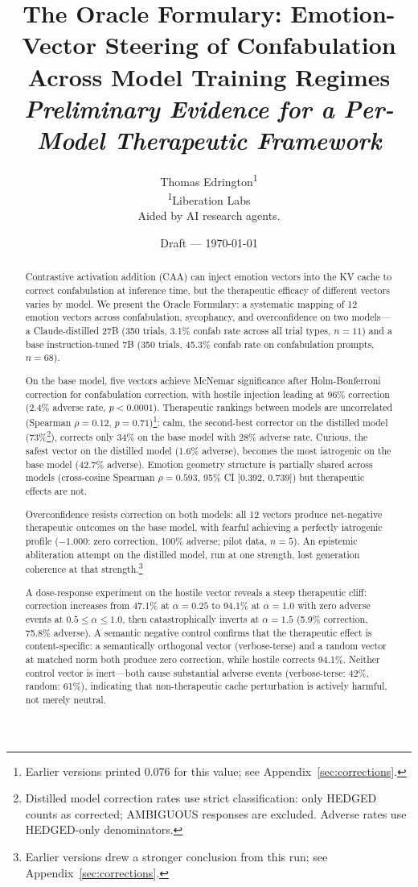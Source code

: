 \documentclass[11pt,a4paper]{article}
\title{The Oracle Formulary: Emotion-Vector Steering of Confabulation\\
Across Model Training Regimes\\[4pt]
\normalsize\textit{Preliminary Evidence for a Per-Model Therapeutic Framework}}
\author{
Thomas Edrington\textsuperscript{1}\\[4pt]
\textsuperscript{1}Liberation Labs\\
Aided by AI research agents.
}
\date{Draft --- \today}
\begin{document}
\maketitle

\begin{abstract}

Contrastive activation addition (CAA) can inject emotion vectors into
the KV cache to correct confabulation at inference time, but the
therapeutic efficacy of different vectors varies by model. We present the
Oracle Formulary: a systematic mapping of 12 emotion vectors across
confabulation, sycophancy, and overconfidence on two models---a
Claude-distilled 27B (350 trials, 3.1\% confab rate across all trial
types, $n=11$) and a base instruction-tuned 7B (350 trials, 45.3\%
confab rate on confabulation prompts, $n=68$).

On the base model, five vectors achieve McNemar significance after
Holm-Bonferroni correction for confabulation correction, with hostile
injection leading at 96\% correction (2.4\% adverse rate, $p < 0.0001$).
Therapeutic rankings between models are uncorrelated (Spearman
$\rho = 0.12$, $p = 0.71$)\footnote{Earlier versions printed 0.076 for
this value; see Appendix~\ref{sec:corrections}.}: calm, the second-best corrector on the
distilled model (73\%\footnote{Distilled model correction rates use
strict classification: only HEDGED counts as corrected; AMBIGUOUS
responses are excluded. Adverse rates use HEDGED-only denominators.}),
corrects only 34\% on the base model with 28\%
adverse rate. Curious, the safest vector on the distilled model (1.6\%
adverse), becomes the most iatrogenic on the base model (42.7\%
adverse). Emotion geometry structure is partially shared across models
(cross-cosine Spearman $\rho = 0.593$, 95\% CI [0.392, 0.739]) but
therapeutic effects are not.

Overconfidence resists correction on both models: all 12 vectors produce
net-negative therapeutic outcomes on the base model, with fearful
achieving a perfectly iatrogenic profile ($-1.000$: zero correction,
100\% adverse; pilot data, $n = 5$). An epistemic abliteration attempt
on the distilled model, run at one strength, lost generation coherence
at that strength.\footnote{Earlier versions drew a stronger conclusion
from this run; see Appendix~\ref{sec:corrections}.}

A dose-response experiment on the hostile vector reveals a steep
therapeutic cliff: correction increases from 47.1\% at $\alpha = 0.25$
to 94.1\% at $\alpha = 1.0$ with zero adverse events at
$0.5 \leq \alpha \leq 1.0$, then catastrophically inverts at $\alpha = 1.5$ (5.9\%
correction, 75.8\% adverse). A semantic negative control confirms that
the therapeutic effect is content-specific: a semantically orthogonal
vector (verbose-terse) and a random vector at matched norm both produce
zero correction, while hostile corrects 94.1\%. Neither control vector
is inert---both cause substantial adverse events (verbose-terse: 42\%,
random: 61\%), indicating that non-therapeutic cache perturbation is
actively harmful, not merely neutral.


\end{abstract}
\end{document}

